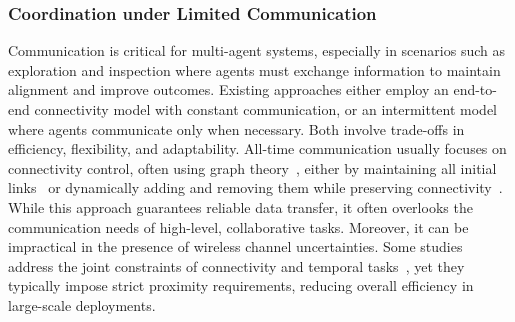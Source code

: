 \subsubsection{Coordination under Limited Communication}
Communication is critical for multi-agent systems, especially in scenarios such as exploration and inspection where agents
must exchange information to maintain alignment and improve outcomes. Existing approaches
either employ an end-to-end connectivity model with constant communication, or an intermittent
model where agents communicate only when necessary. Both involve trade-offs in efficiency,
flexibility, and adaptability. All-time communication usually focuses on connectivity control,
often using graph theory~\cite{griparic2022consensus, nguyen2024connectivity}, either by maintaining all initial links~\cite{griparic2022consensus}
or dynamically adding and removing them while preserving connectivity~\cite{derbakova2011decentralized}.
{While this approach guarantees reliable data transfer,
it often overlooks the communication needs of high-level, collaborative tasks.
Moreover, it can be impractical in the presence of wireless channel uncertainties.}
Some studies address the joint constraints of connectivity
and temporal tasks~\cite{luo2019minimum}, yet they
typically impose strict proximity requirements, reducing overall efficiency in large-scale deployments.


